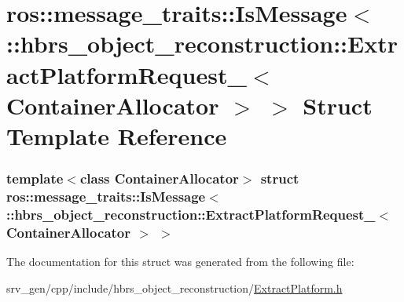 \hypertarget{structros_1_1message__traits_1_1_is_message_3_01_1_1hbrs__object__reconstruction_1_1_extract_pla7e78e3b0383459f7960736e0422fff1c}{\section{ros\-:\-:message\-\_\-traits\-:\-:\-Is\-Message$<$ \-:\-:hbrs\-\_\-object\-\_\-reconstruction\-:\-:\-Extract\-Platform\-Request\-\_\-$<$ \-Container\-Allocator $>$ $>$ \-Struct \-Template \-Reference}
\label{structros_1_1message__traits_1_1_is_message_3_01_1_1hbrs__object__reconstruction_1_1_extract_pla7e78e3b0383459f7960736e0422fff1c}
}
\subsubsection*{template$<$class Container\-Allocator$>$ struct ros\-::message\-\_\-traits\-::\-Is\-Message$<$ \-::hbrs\-\_\-object\-\_\-reconstruction\-::\-Extract\-Platform\-Request\-\_\-$<$ Container\-Allocator $>$ $>$}



\-The documentation for this struct was generated from the following file\-:\begin{DoxyCompactItemize}
\item 
srv\-\_\-gen/cpp/include/hbrs\-\_\-object\-\_\-reconstruction/\hyperlink{_extract_platform_8h}{\-Extract\-Platform.\-h}\end{DoxyCompactItemize}
